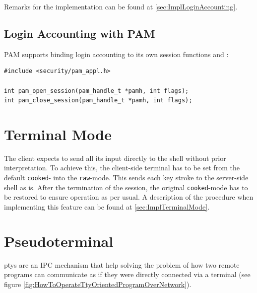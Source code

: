 \documentclass[10pt,a4paper,titlepage,twoside,english,final]{zhawreprt}
\begin{document}
Remarks for the implementation can be found at \ref{sec:ImplLoginAccounting}.

\subsection{Login Accounting with PAM}\label{ssec:DesignLoginAccountingWithPAM}
\gls{PAM} supports binding \gls{login} accounting to its own session functions \cite{pam_open_session} and \cite{pam_close_session}:
\setlistingC
\begin{lstlisting}[caption={\gls{PAM} session management},label=lst:PAMSessionManagement]
#include <security/pam_appl.h>

int pam_open_session(pam_handle_t *pamh, int flags);
int pam_close_session(pam_handle_t *pamh, int flags);
\end{lstlisting}

\section{Terminal Mode}\label{sec:DesignTerminalMode}
The client expects to send all its input directly to the \gls{shell} without prior interpretation.
To achieve this, the client-side \gls{terminal} has to be set from the default \texttt{cooked}- into the \texttt{raw}-mode\citep[p.1309]{KerriskTLPI}.
This sends each key stroke to the server-side \gls{shell} as is.
After the termination of the session, the original \texttt{cooked}-mode has to be restored to ensure operation as per usual.
A description of the procedure when implementing this feature can be found at \ref{sec:ImplTerminalMode}.


\newpage
\section{Pseudoterminal}\label{sec:DesignPseudoterminal}
\glspl{pty} are an \gls{IPC} mechanism that help solving the problem of how two remote programs can communicate as if they were directly connected via a \gls{terminal} (see figure \ref{fig:HowToOperateTtyOrientedProgramOverNetwork}).
\end{document}
